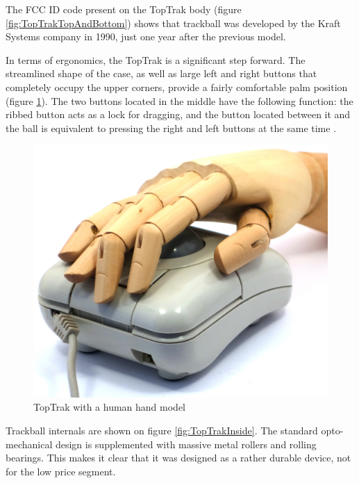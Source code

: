 \documentclass[11pt, a4paper]{article}
\begin{document}
The FCC ID code present on the TopTrak body (figure \ref{fig:TopTrakTopAndBottom}) shows that trackball was developed by the Kraft Systems company in 1990, just one year after the previous model.

In terms of ergonomics, the TopTrak is a significant step forward. The streamlined shape of the case, as well as large left and right buttons that completely occupy the upper corners, provide a fairly comfortable palm position (figure \ref{fig:TopTrakHand}). The two buttons located in the middle have the following function: the ribbed button acts as a lock for dragging, and the button located between it and the ball is equivalent to pressing the right and left buttons at the same time \cite{mouses}.


\begin{figure}[h]
    \centering
    \includegraphics[scale=0.45]{1990_kraft_toptrack/hand_60.jpg}
    \caption{TopTrak with a human hand model}
    \label{fig:TopTrakHand}
\end{figure}



Trackball internals are shown on figure \ref{fig:TopTrakInside}. The standard opto-mechanical design is supplemented with massive metal rollers and rolling bearings. This makes it clear that it was designed as a rather durable device, not for the low price segment.
\end{document}
